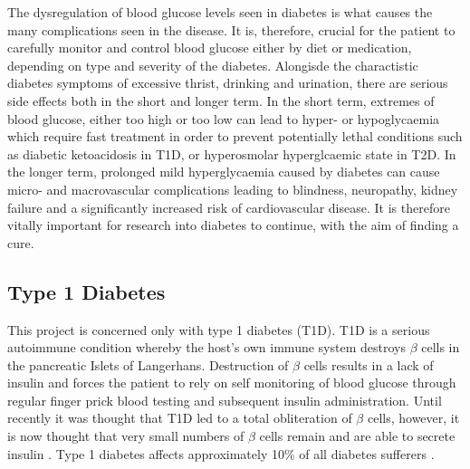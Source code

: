 The dysregulation of blood glucose levels seen in diabetes is what causes the many complications seen in the disease.
It is, therefore, crucial for the patient to carefully monitor and control blood glucose either by diet or medication, depending on type and severity of the diabetes.
Alongisde the charactistic diabetes symptoms of excessive thrist, drinking and urination, there are serious side effects both in the short and longer term.
In the short term, extremes of blood glucose, either too high or too low can lead to hyper- or hypoglycaemia which require fast treatment in order to prevent potentially lethal conditions such as diabetic ketoacidosis in T1D, or hyperosmolar hyperglcaemic state in T2D.
In the longer term, prolonged mild hyperglycaemia caused by diabetes can cause micro- and macrovascular complications leading to blindness, neuropathy, kidney failure and a significantly increased risk of cardiovascular disease\citep{OxClinMed}.
It is therefore vitally important for research into diabetes to continue, with the aim of finding a cure.

\subsection{Type 1 Diabetes}

This project is concerned only with type 1 diabetes (T1D).
T1D is a serious autoimmune condition whereby the host's own immune system destroys $\beta$ cells in the pancreatic Islets of Langerhans.
Destruction of $\beta$ cells results in a lack of insulin and forces the patient to rely on self monitoring of blood glucose through regular finger prick blood testing and subsequent insulin administration.
Until recently it was thought that T1D led to a total obliteration of $\beta$ cells, however, it is now thought that very small numbers of $\beta$ cells remain and are able to secrete insulin \citep{Oram2014, Veld2014}.
Type 1 diabetes affects approximately 10\% of all diabetes sufferers \citep{DiabetesUK}.






